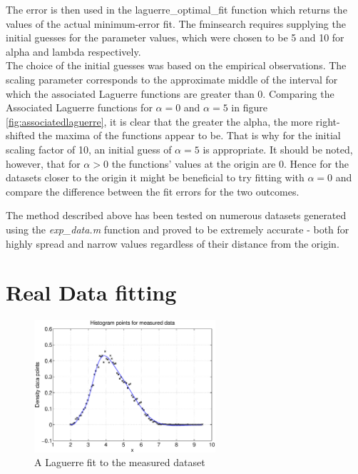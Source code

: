 \documentclass[a4paper]{article}
\numberwithin{equation}{section}
\begin{document}


\noindent The error is then used in the laguerre\_optimal\_fit function which returns the values of the actual minimum-error fit. The fminsearch requires supplying the initial guesses for the parameter values, which were chosen to be 5 and 10 for alpha and lambda respectively. \\

\noindent The choice of the initial guesses was based on the empirical observations. The scaling parameter corresponds to the approximate middle of the interval for which the associated Laguerre functions are greater than 0.
Comparing the Associated Laguerre functions for $\alpha = 0$ and $\alpha = 5$ in figure \ref{fig:associatedlaguerre}, it is clear that the greater the alpha, the more right-shifted the maxima of the functions appear to be. That is why for the initial scaling factor of 10, an initial guess of $\alpha = 5$ is appropriate. It should be noted, however, that for $\alpha > 0$ the functions' values at the origin are 0. Hence for the datasets closer to the origin it might be beneficial to try fitting with $\alpha = 0$ and compare the difference between the fit errors for the two outcomes.



\noindent The method described above has been tested on numerous datasets generated using the \textit{exp\_data.m} function and proved to be extremely accurate - both for highly spread and narrow values regardless of their distance from the origin.

\section{Real Data fitting}

\begin{figure}[!h]
\centering
\includegraphics[width=0.6\textwidth]{real_data_fit.eps}
\caption{\label{fig:realdataset}A Laguerre fit to the measured dataset}
\end{figure}
\end{document}
